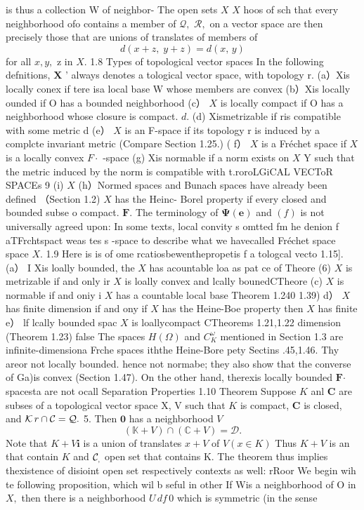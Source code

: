 is thus a collection W of neighbor- The open sets $\textstyle X$ $\textstyle X$ hoos of sch that every neighborhood ofo contains a member of ${\mathcal{Q}},$ ${\mathcal{R}},$ on a vector space are then precisely those that are unions of translates of members of $$ d(x+z,\;y+z)=d(x,\,y) $$ for all $x,y,$ z in $X.$ 1.8 Types of topological vector spaces In the following defnitions, ${\boldsymbol{X}}$ ’ always denotes a tological vector space, with topology r. (a）Xis locally conex if tere isa local base W whose members are convex (b）Xis locally ounded if O has a bounded neighborhood (c） $\textstyle X$ is locally compact if O has a neighborhood whose closure is compact. ${\mathit{d}}.$ (d) Xismetrizable if ris compatible with some metric d (e） $X$ is an F-space if its topology r is induced by a complcte invariant metric (Compare Section 1.25.) ( f） $\textstyle X$ is a Fréchet space if $\textstyle X$ is a locally convex $\textstyle F\cdot$ -space (g) Xis normable if a norm exists on $\textstyle X$ Y such that the metric induced by the norm is compatible with t.roroLGiCAL VECToR SPACEs 9 (i) $X$ (h）Normed spaces and Bunach spaces have already been defined （Section 1.2) $\textstyle X$ has the Heinc- Borel property if every closed and bounded subse o compact. ${\boldsymbol{F}}.$ The terminology of $\mathbf{\Psi}({\boldsymbol{e}})$ and $(f)$ is not universally agreed upon: In some texts, local convity s omtted fm he denion f aTFrchtspact weas tes s -space to describe what we havecalled Fréchet space space $X.$ 1.9 Here is is of ome rcatiosbewenthepropetis f a tologcal vecto 1.15]. (a） I Xis loally bounded, the $X$ has acountable loa as pat ce of Theore (6) $\textstyle X$ is metrizable if and only ir $\textstyle X$ is loally convex and lcally bounedCTheore (c) $\textstyle X$ is normable if and oniy i $X$ has a countable local base Theorem 1.240 1.39) d） $\textstyle X$ has finite dimension if and ony if $\textstyle X$ has the Heine-Boe property then $\textstyle X$ has finite e） lf lcally bounded spac $\textstyle X$ is loallycompact CTheorems 1.21,1.22 dimension (Theorem 1.23) false The spaces $H(\Omega)$ and ${C_{K}^{\omega}}$ mentioned in Section 1.3 are infinite-dimensiona Frche spaces iththe Heine-Bore pety Sectins .45,1.46. Thy areor not locally bounded. hence not normabe; they also show that the converse of Ga)is convex (Section 1.47). On the other hand, therexis locally bounded ${\boldsymbol{F}}{\boldsymbol{\cdot}}$ spacesta are not ocall Separation Properties 1.10 Theorem Suppose $\textstyle K$ anl ${\boldsymbol{C}}$ are subses of a topological vector space X, V such that $K$ is compact, ${\boldsymbol{C}}$ is closed, and ${\cal K}\,r\cap{\cal C}={\mathcal Q}.$ 5. Then $\mathbf{0}$ has a neighborhood ${\mathbf{}}V$ $$ (\mathbb{K}+V)\cap(\mathbb{C}+V)={\mathcal{D}}. $$ Note that $K+V\mathbf{i}$ is a union of translates $x+V$ of $V\left(x\in K\right)$ Thus $K+V$ is an that contain $\textstyle K$ and ${\cal{C}}_{,}$ open set that contains K. The theorem thus implies thexistence of disioint open set respectively contexts as well: rRoor We begin wih te following proposition, which wil b seful in other If Wis a neighborhood of O in $X,$ then there is a neighborhood $\scriptstyle U\,d f\,0$ which is symmetric (in the sense 
